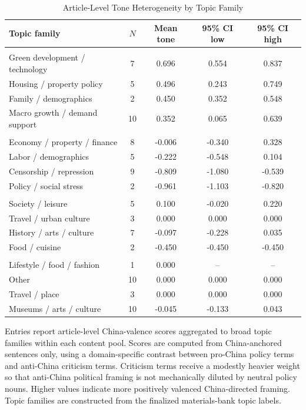 \begin{table}[H]
\centering
\begin{threeparttable}
\caption{Article-Level Tone Heterogeneity by Topic Family}
\label{tab:topic_tone_heterogeneity}
\footnotesize
\begin{tabular}{lcccc}
\toprule
Topic family & $N$ & Mean tone & 95\% CI low & 95\% CI high\\
\midrule
\addlinespace[0.35em]
\multicolumn{5}{l}{\textit{Pro-China}}\\
Green development / technology & 7 & 0.696 & 0.554 & 0.837\\
Housing / property policy & 5 & 0.496 & 0.243 & 0.749\\
Family / demographics & 2 & 0.450 & 0.352 & 0.548\\
Macro growth / demand support & 10 & 0.352 & 0.065 & 0.639\\
\addlinespace[0.35em]
\multicolumn{5}{l}{\textit{Anti-China}}\\
Economy / property / finance & 8 & -0.006 & -0.340 & 0.328\\
Labor / demographics & 5 & -0.222 & -0.548 & 0.104\\
Censorship / repression & 9 & -0.809 & -1.080 & -0.539\\
Policy / social stress & 2 & -0.961 & -1.103 & -0.820\\
\addlinespace[0.35em]
\multicolumn{5}{l}{\textit{Apolitical China}}\\
Society / leisure & 5 & 0.100 & -0.020 & 0.220\\
Travel / urban culture & 3 & 0.000 & 0.000 & 0.000\\
History / arts / culture & 7 & -0.097 & -0.228 & 0.035\\
Food / cuisine & 2 & -0.450 & -0.450 & -0.450\\
\addlinespace[0.35em]
\multicolumn{5}{l}{\textit{Non-China control}}\\
Lifestyle / food / fashion & 1 & 0.000 & -- & --\\
Other & 10 & 0.000 & 0.000 & 0.000\\
Travel / place & 3 & 0.000 & 0.000 & 0.000\\
Museums / arts / culture & 10 & -0.045 & -0.133 & 0.043\\
\bottomrule
\end{tabular}
\begin{tablenotes}
\footnotesize
\item Entries report article-level China-valence scores aggregated to broad topic families within each content pool. Scores are computed from China-anchored sentences only, using a domain-specific contrast between pro-China policy terms and anti-China criticism terms. Criticism terms receive a modestly heavier weight so that anti-China political framing is not mechanically diluted by neutral policy nouns. Higher values indicate more positively valenced China-directed framing. Topic families are constructed from the finalized materials-bank topic labels.
\end{tablenotes}
\end{threeparttable}
\end{table}
